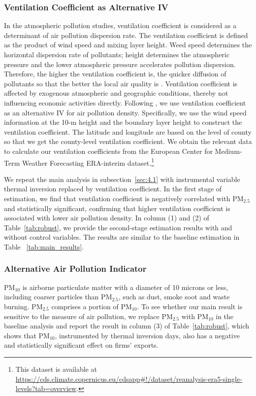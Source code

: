 \documentclass[12pt]{article}
\begin{document}
\subsubsection{Ventilation Coefficient as Alternative IV}
In the atmospheric pollution studies, ventilation coefficient is considered as a determinant of air pollution dispersion rate.
The ventilation coefficient is defined as the product of wind speed and mixing layer height. Weed speed determines the horizontal dispersion rate
of pollutants; height determines the atmospheric pressure and the lower atmospheric pressure accelerates pollution dispersion. Therefore, the higher
the ventilation coefficient is, the quicker diffusion of pollutants so that the better the local air quality is \citep{arya1999air}. Ventilation coefficient 
is affected by exogenous atmospheric and geographic conditions, thereby not influencing economic activities directly. Following \citep{broner2012sources,hering2014environmental,shi2018environmental,
wu2021greening}, we use ventilation coefficient
as an alternative IV for air pollution density. Specifically, we use the wind speed information at the 10-m height and the boundary layer height to construct the ventilation
coefficient. The latitude and longitude are based on the level of county so
that we get the county-level ventilation coefficient. We obtain the relevant
data to calculate our ventilation coefficients from the European Center for
Medium-Term Weather Forecasting ERA-interim dataset.\footnote{This dataset is available at \url{https://cds.climate.copernicus.eu/cdsapp\#!/dataset/reanalysis-era5-single-levels?tab=overview}.}

We repeat the main analysis in subsection~\ref{sec:4.1} with instrumental variable
thermal inversion replaced by ventilation coefficient. In the first stage of
estimation, we find that ventilation coefficient is negatively correlated
with $\mathrm{PM_{2.5}}$ and statistically significant, confirming that
higher ventilation coefficient is associated with lower air pollution
density. In column (1) and (2) of Table~\ref{tab:robust}, we
provide the second-stage estimation results with and without control variables. The results are similar to the baseline estimation in Table~%
\ref{tab:main_results}.

\subsubsection{Alternative Air Pollution Indicator}
 $\mathrm{PM_{10}}$ is airborne particulate matter with a diameter of 10 microns or less, including coarser particles than $\mathrm{PM_{2.5}}$, such as dust, smoke soot and waste burning. $\mathrm{PM_{2.5}}$ comprises a portion of $\mathrm{PM_{10}}$. To see whether our main result is sensitive
to the measure of air pollution, we replace $\mathrm{PM_{2.5}}$ with $%
\mathrm{PM_{10}}$ in the baseline analysis and report the result in column
(3) of Table~\ref{tab:robust}, which shows that $\mathrm{PM_{10}}$,
instrumented by thermal inversion days, also has a negative and
statistically significant effect on firms' exports.
\end{document}
